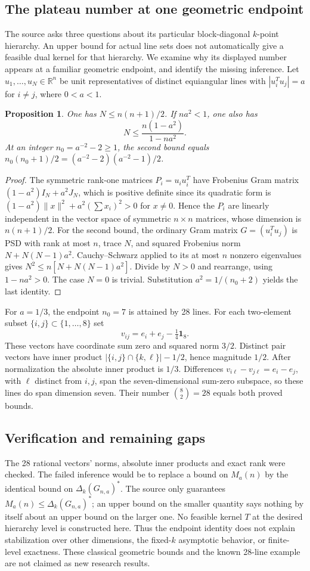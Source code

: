 \documentclass[11pt]{article}
\newtheorem{proposition}{Proposition}
\begin{document}
\subsection{The plateau number at one geometric endpoint}
The source asks three questions about its particular block-diagonal $k$-point hierarchy. An upper bound for actual line sets does not automatically give a feasible dual kernel for that hierarchy. We examine why its displayed number appears at a familiar geometric endpoint, and identify the missing inference.
Let $u_1,\ldots,u_N\in\mathbb R^n$ be unit representatives of distinct equiangular lines with $|u_i^Tu_j|=a$ for $i\ne j$, where $0<a<1$.
\begin{proposition}
One has $N\le n(n+1)/2$. If $na^2<1$, one also has
\[
N\le\frac{n(1-a^2)}{1-na^2}.
\]
At an integer $n_0=a^{-2}-2\ge1$, the second bound equals $n_0(n_0+1)/2=(a^{-2}-2)(a^{-2}-1)/2$.
\end{proposition}
\begin{proof}
The symmetric rank-one matrices $P_i=u_iu_i^T$ have Frobenius Gram matrix $(1-a^2)I_N+a^2J_N$, which is positive definite since its quadratic form is $(1-a^2)\|x\|^2+a^2(\sum x_i)^2>0$ for $x\ne0$. Hence the $P_i$ are linearly independent in the vector space of symmetric $n\times n$ matrices, whose dimension is $n(n+1)/2$.
For the second bound, the ordinary Gram matrix $G=(u_i^Tu_j)$ is PSD with rank at most $n$, trace $N$, and squared Frobenius norm $N+N(N-1)a^2$. Cauchy--Schwarz applied to its at most $n$ nonzero eigenvalues gives $N^2\le n[N+N(N-1)a^2]$. Divide by $N>0$ and rearrange, using $1-na^2>0$. The case $N=0$ is trivial. Substitution $a^2=1/(n_0+2)$ yields the last identity.
\end{proof}
For $a=1/3$, the endpoint $n_0=7$ is attained by 28 lines. For each two-element subset $\{i,j\}\subset\{1,\ldots,8\}$ set
\[
v_{ij}=e_i+e_j-\tfrac14\mathbf1_8.
\]
These vectors have coordinate sum zero and squared norm $3/2$. Distinct pair vectors have inner product $|\{i,j\}\cap\{k,\ell\}|-1/2$, hence magnitude $1/2$. After normalization the absolute inner product is $1/3$. Differences $v_{i\ell}-v_{j\ell}=e_i-e_j$, with $\ell$ distinct from $i,j$, span the seven-dimensional sum-zero subspace, so these lines do span dimension seven. Their number $\binom82=28$ equals both proved bounds.
\subsection{Verification and remaining gaps}
The 28 rational vectors' norms, absolute inner products and exact rank were checked. The failed inference would be to replace a bound on $M_a(n)$ by the identical bound on $\Delta_k(G_{n,a})^*$. The source only guarantees $M_a(n)\le\Delta_k(G_{n,a})^*$; an upper bound on the smaller quantity says nothing by itself about an upper bound on the larger one. No feasible kernel $T$ at the desired hierarchy level is constructed here. Thus the endpoint identity does not explain stabilization over other dimensions, the fixed-$k$ asymptotic behavior, or finite-level exactness. These classical geometric bounds and the known 28-line example are not claimed as new research results.
\end{document}
